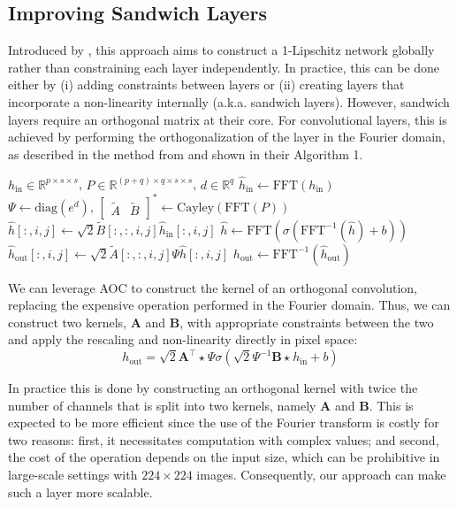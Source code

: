 \documentclass[10pt]{article}
\theoremstyle{plain}
\theoremstyle{definition}
\theoremstyle{remark}
\newcommand{\kernel}[1]{\mathbf{#1}}
\newcommand{\convker}[1]{\star_{#1}}
\begin{document}
    \subsection{Improving Sandwich Layers \cite{wang_direct_2023}}
    \label{sec:improving_sandwich}
    Introduced by \cite{wang_direct_2023}, this approach aims to construct a 1-Lipschitz network globally rather than constraining each layer independently. In practice, this can be done either by (i) adding constraints between layers or (ii) creating layers that incorporate a non-linearity internally (a.k.a. sandwich layers). However, sandwich layers require an orthogonal matrix at their core. For convolutional layers, this is achieved by performing the orthogonalization of the layer in the Fourier domain, as described in the method from \cite{trockman_orthogonalizing_2021} and shown in their Algorithm 1.
    \begin{algorithm}
        \caption{Sandwich convolutional layer (from \cite{wang_direct_2023})}
        \begin{algorithmic}[1]
            \Require $h_\text{in} \in \mathbb{R}^{p \times s \times s}$, $P \in \mathbb{R}^{(p+q) \times q \times s \times s}$, $d \in \mathbb{R}^q$
            \State $\hat{h}_\text{in} \gets \text{FFT}(h_\text{in})$
            \State $\Psi \gets \text{diag}(e^d), \, \begin{bmatrix} \tilde{A} & \tilde{B} \end{bmatrix}^* \gets \text{Cayley}(\text{FFT}(P))$
            \State $\hat{h}[:, i, j] \gets \sqrt{2} \tilde{B}[:, :, i, j] \hat{h}_\text{in}[:, i, j]$
            \State $\hat{h} \gets \text{FFT}(\sigma(\text{FFT}^{-1}(\hat{h}) + b))$
            \State $\hat{h}_\text{out}[:, i, j] \gets \sqrt{2} \tilde{A}[:, :, i, j] \Psi \hat{h}[:, i, j]$
            \State $h_\text{out} \gets \text{FFT}^{-1}(\hat{h}_\text{out})$
        \end{algorithmic}
    \end{algorithm}

    We can leverage AOC to construct the kernel of an orthogonal convolution, replacing the expensive operation performed in the Fourier domain. Thus, we can construct two kernels, $\kernel{A}$ and $\kernel{B}$, with appropriate constraints between the two and apply the rescaling and non-linearity directly in pixel space:
    \[
    h_\text{out} = \sqrt{2} \kernel{A}^\top \convker{} \Psi \sigma \left( \sqrt{2} \Psi^{-1} \kernel{B} \convker{} h_\text{in} + b \right)
    \]

    In practice this is done by constructing an orthogonal kernel with twice the number of channels that is split into two kernels, namely $\kernel{A}$ and $\kernel{
    B}$. This is expected to be more efficient since the use of the Fourier transform is costly for two reasons: first, it necessitates computation with complex values; and second, the cost of the operation depends on the input size, which can be prohibitive in large-scale settings with $224 \times 224$ images. Consequently, our approach can make such a layer more scalable.
\end{document}
